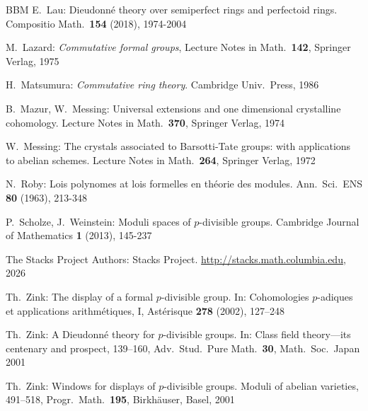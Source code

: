 \documentclass[a4paper,11pt]{article}
\theoremstyle{plain}
\theoremstyle{definition}
\theoremstyle{remark}
\theoremstyle{definition}
\numberwithin{Lemma}{section}
\numberwithin{Subpoint}{Lemma}
\numberwithin{equation}{section}
\begin{document}
\begin{thebibliography}{BBM}
E.~Lau:
Dieudonn\'e theory over semiperfect rings and perfectoid rings.
Compositio Math.\ {\bf 154} (2018), 1974-2004

M.~Lazard: {\it Commutative formal groups},
Lecture Notes in Math.\ {\bf 142}, Springer Verlag, 1975

H.~Matsumura:
{\it Commutative ring theory}.
Cambridge Univ.\ Press, 1986

B.~Mazur, W.~Messing: 
Universal extensions and one dimensional crystalline cohomology.
Lecture Notes in Math.\ {\bf 370}, Springer Verlag, 1974

W.~Messing:
The crystals associated to Barsotti-Tate groups: 
with applications to abelian schemes. 
Lecture Notes in Math.\ {\bf 264}, Springer Verlag, 1972

N.~Roby:
Lois polynomes at lois formelles en th\'eorie des modules.
Ann.\  Sci.\ ENS {\bf 80} (1963), 213-348 

P.~Scholze, J.~Weinstein:
Moduli spaces of $p$-divisible groups.
Cambridge Journal of Mathematics {\bf 1} (2013), 145-237

The Stacks Project Authors: Stacks Project. 
\url{http://stacks.math.columbia.edu}, 2026

Th.~Zink:
The display of a formal $p$-divisible group.
In: Cohomologies $p$-adiques et applications arithm\'etiques, I, 
Ast\'{e}risque {\bf 278} (2002), 127--248

Th.~Zink: 
A Dieudonn\'{e} theory for $p$-divisible groups.
In: Class field theory---its centenary and prospect, 
139--160, Adv.\ Stud.\ Pure Math.\ {\bf 30}, 
Math.\ Soc.\ Japan 2001

Th.~Zink:
Windows for displays of $p$-divisible groups. 
Moduli of abelian varieties, 491--518, 
Progr.\ Math.\ {\bf 195}, Birkh\"{a}user, Basel, 2001

\end{thebibliography}
\end{document}
